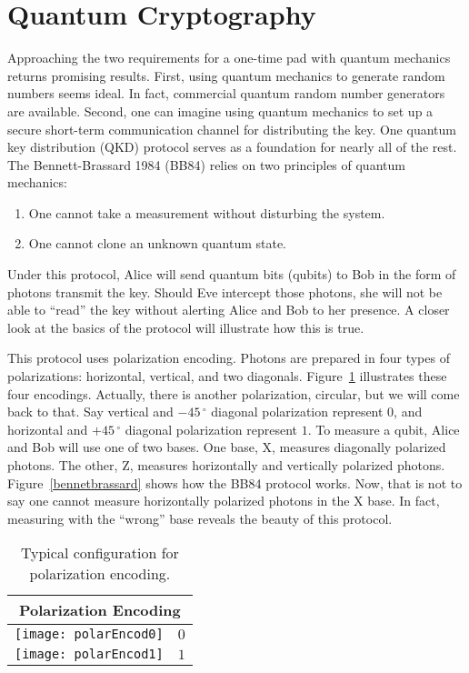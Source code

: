 \documentclass[12pt,twocolumn]{article}
\begin{document}
\section{Quantum Cryptography}
Approaching the two requirements for a one-time pad with quantum mechanics returns promising results. First, using quantum mechanics to generate random numbers seems ideal\cite{bell:64}. In fact, commercial quantum random number generators are available\cite{idQ}. Second, one can imagine using quantum mechanics to set up a secure short-term communication channel for distributing the key. One quantum key distribution (QKD) protocol serves as a foundation for nearly all of the rest. The Bennett-Brassard 1984 (BB84) relies on two principles of quantum mechanics:
\begin{enumerate}
\item One cannot take a measurement without disturbing the system.
\item One cannot clone an unknown quantum state.
\end{enumerate}
Under this protocol, Alice will send quantum bits (qubits) to Bob in the form of photons transmit the key. Should Eve intercept those photons, she will not be able to ``read'' the key without alerting Alice and Bob to her presence. A closer look at the basics of the protocol will illustrate how this is true.

This protocol uses polarization encoding.
Photons are prepared in four types of polarizations: horizontal, vertical, and two diagonals. Figure~\ref{pe} illustrates these four encodings. Actually, there is another polarization, circular, but we will come back to that. Say vertical and $-45\,^{\circ}$ diagonal polarization represent 0, and horizontal and $+45\,^{\circ}$ diagonal polarization represent $1$. To measure a qubit, Alice and Bob will use one of two bases. One base, X, measures diagonally polarized photons. The other, Z, measures horizontally and vertically polarized photons. Figure~\ref{bennetbrassard} shows how the BB84 protocol works. Now, that is not to say one cannot measure horizontally polarized photons in the X base. In fact, measuring with the “wrong” base reveals the beauty of this protocol.
\begin{table}[hbp]
\begin{tabular}{|c|c|}
\hline
\multicolumn{2}{|c|}{Polarization Encoding}\\
\hline
\texttt{[image: polarEncod0]} & $0$ \\
\hline
\texttt{[image: polarEncod1]} & $1$ \\
\hline
\end{tabular}
\caption{Typical configuration for polarization encoding.\label{pe}}
\end{table}
\end{document}
